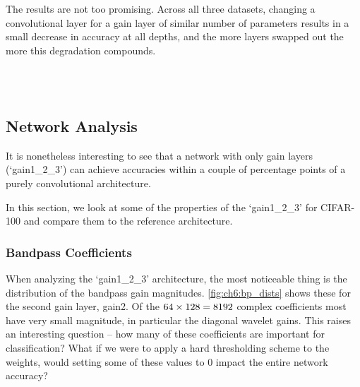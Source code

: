 The results are not too promising. Across all three datasets, changing a
convolutional layer for a gain layer of similar number of parameters
results in a small decrease in accuracy at all depths, and the more layers
swapped out the more this degradation compounds.

\begin{figure}
  \centering
  \\
  \\
  \label{fig:ch6:gl_results}
\end{figure}

\subsection{Network Analysis}
It is nonetheless interesting to see that a network with only gain layers
(`gain1\_2\_3') can achieve accuracies within a couple of percentage points of a
purely convolutional architecture. 

In this section, we look at some of the properties of the `gain1\_2\_3' for
CIFAR-100 and compare them to the reference architecture.

\subsubsection{Bandpass Coefficients}
When analyzing the `gain1\_2\_3' architecture, the most noticeable thing is the
distribution of the bandpass gain magnitudes. \autoref{fig:ch6:bp_dists} shows
these for the second gain layer, gain2. Of the $64\times 128=8192$ complex
coefficients most have very small magnitude, in particular the diagonal wavelet
gains. This raises an interesting question -- how many of these coefficients are
important for classification? What if we were to apply a hard thresholding
scheme to the weights, would setting some of these values to 0 impact the
entire network accuracy? 

